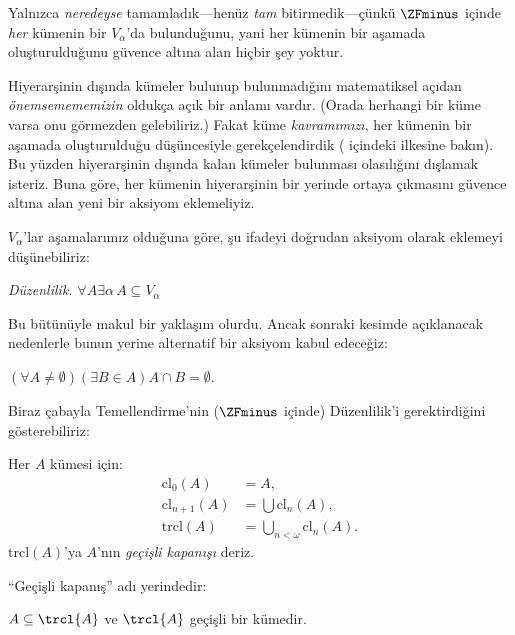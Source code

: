 \documentclass[../../../include/open-logic-section]{subfiles}
\begin{document}


Yalnızca \emph{neredeyse} tamamladık---henüz \emph{tam} bitirmedik---çünkü
$\ZFminus$ içinde \emph{her} kümenin bir $V_\alpha$'da bulunduğunu, yani
her kümenin bir aşamada oluşturulduğunu güvence altına alan hiçbir şey
yoktur.

Hiyerarşinin dışında kümeler bulunup bulunmadığını matematiksel açıdan
\emph{önemsemememizin} oldukça açık bir anlamı vardır. (Orada herhangi bir
küme varsa onu görmezden gelebiliriz.) Fakat küme \emph{kavramımızı}, her
kümenin bir aşamada oluşturulduğu düşüncesiyle gerekçelendirdik
( içindeki \stageshier{} ilkesine bakın). Bu yüzden
hiyerarşinin dışında kalan kümeler bulunması olasılığını dışlamak isteriz.
Buna göre, her kümenin hiyerarşinin bir yerinde ortaya çıkmasını güvence
altına alan yeni bir aksiyom eklemeliyiz.

$V_\alpha$'lar aşamalarımız olduğuna göre, şu ifadeyi doğrudan aksiyom
olarak eklemeyi düşünebiliriz:

\begin{defish}
\emph{Düzenlilik.} $\forall A \exists \alpha\, A \subseteq V_\alpha$
\end{defish}

Bu bütünüyle makul bir yaklaşım olurdu. Ancak sonraki kesimde açıklanacak
nedenlerle bunun yerine alternatif bir aksiyom kabul edeceğiz:

\begin{axiom}[Temellendirme]
$(\forall A \neq \emptyset)(\exists B \in A)A \cap B = \emptyset$.
\end{axiom}

Biraz çabayla Temellendirme'nin ($\ZFminus$ içinde) Düzenlilik'i
gerektirdiğini gösterebiliriz:
\begin{defn}
Her $A$ kümesi için:
\begin{align*}
	\text{cl}_0(A) &= A,\\
	\text{cl}_{n+1}(A) &= \bigcup \text{cl}_n(A),\\
	\text{trcl}(A) &= \bigcup_{n < \omega} \text{cl}_{n}(A).
\end{align*}
$\text{trcl}(A)$'ya $A$'nın \emph{geçişli kapanışı} deriz.
\end{defn}
\noindent
``Geçişli kapanış'' adı yerindedir:
\begin{prop}
$A \subseteq \trcl{A}$ ve $\trcl{A}$ geçişli bir kümedir.
\end{prop}
\end{document}
